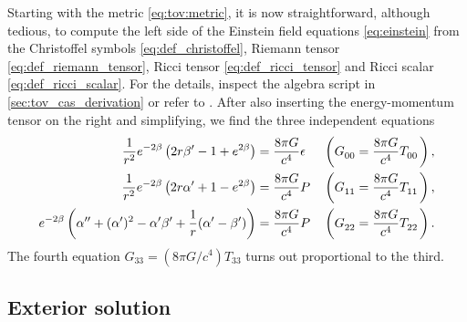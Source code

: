 Starting with the metric \eqref{eq:tov:metric}, it is now straightforward, although tedious, to compute the left side of the Einstein field equations \eqref{eq:einstein} from the Christoffel symbols \eqref{eq:def_christoffel}, Riemann tensor \eqref{eq:def_riemann_tensor}, Ricci tensor \eqref{eq:def_ricci_tensor} and Ricci scalar \eqref{eq:def_ricci_scalar}.
For the details, inspect the algebra script in \cref{sec:tov_cas_derivation} or refer to \cite[equation 5.11-5.15]{ref:carroll}.
After also inserting the energy-momentum tensor on the right and simplifying, we find the three independent equations
\begin{subequations}
\begin{align}
	\frac{1}{r^2} e^{-2 \beta} \left( 2 r \beta' - 1 + e^{2 \beta} \right)                               &= \frac{8 \pi G}{c^4} \epsilon
	&& \left( G\indices{_0_0} = \frac{8 \pi G}{c^4} T\indices{_0_0} \right) , \label{eq:einstein_to_tov:tt} \\
	\frac{1}{r^2} e^{-2 \beta} \left( 2 r \alpha' + 1 - e^{2 \beta} \right)                              &= \frac{8 \pi G}{c^4} P
	&& \left( G\indices{_1_1} = \frac{8 \pi G}{c^4} T\indices{_1_1} \right) , \label{eq:einstein_to_tov:rr} \\
	e^{-2 \beta} \left( \alpha'' + (\alpha')^2 - \alpha' \beta' + \frac{1}{r} (\alpha' - \beta') \right) &= \frac{8 \pi G}{c^4} P
	&& \left( G\indices{_2_2} = \frac{8 \pi G}{c^4} T\indices{_2_2} \right) . \label{eq:einstein_to_tov:thetatheta}
\end{align}
\label{eq:einstein_to_tov:einstein_equation_in_star}
\end{subequations}
The fourth equation $G_{33} = (8 \pi G / c^4 ) T_{33}$ turns out proportional to the third.

\subsection*{Exterior solution}

